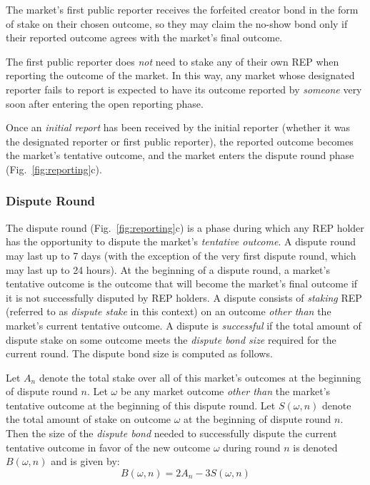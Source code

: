 \documentclass[floatfix,reprint,nofootinbib,amsmath,amssymb,epsfig,pre,floats,letterpaper,groupedaffiliation]{revtex4-1}
\newcommand{\beq}{\begin{equation}}
\newcommand{\eeq}{\end{equation}}
\theoremstyle{definition}
\theoremstyle{definition}
\begin{document}
The market's first public reporter receives the forfeited creator bond in the form of stake on their chosen outcome, so they may claim the no-show bond only if their reported outcome agrees with the market's final outcome.

The first public reporter does \textit{not} need to stake any of their own REP when reporting the outcome of the market.  In this way, any market whose designated reporter fails to report is expected to have its outcome reported by \textit{someone} very soon after entering the open reporting phase.

Once an \textit{initial report} has been received by the initial reporter (whether it was the designated reporter or first public reporter), the reported outcome becomes the market's tentative outcome, and the market enters the dispute round phase (Fig.~\ref{fig:reporting}c).

\subsubsection{Dispute Round}

The dispute round (Fig.~\ref{fig:reporting}c) is a phase during which any REP holder has the opportunity to dispute the market's \textit{tentative outcome}. A dispute round may last up to 7 days (with the exception of the very first dispute round, which may last up to 24 hours). At the beginning of a dispute round, a market's tentative outcome is the outcome that will become the market's final outcome if it is not successfully disputed by REP holders. A dispute consists of \textit{staking} REP (referred to as \textit{dispute stake} in this context) on an outcome \textit{other than} the market's current tentative outcome.  A dispute is \textit{successful} if the total amount of dispute stake on some outcome meets the \textit{dispute bond size} required for the current round.  The dispute bond size is computed as follows.

Let $A_n$ denote the total stake over all of this market's outcomes at the beginning of dispute round $n$.  Let $\omega$ be any market outcome \textit{other than} the market's tentative outcome at the beginning of this dispute round.  Let $S(\omega, n)$ denote the total amount of stake on outcome $\omega$ at the beginning of dispute round $n$.  Then the size of the \textit{dispute bond} needed to successfully dispute the current tentative outcome in favor of the new outcome $\omega$ during round $n$ is denoted $B(\omega, n)$ and is given by:
\beq \label{eq:bond_size}
B(\omega, n) = 2A_n - 3S(\omega, n)
\eeq
\end{document}

